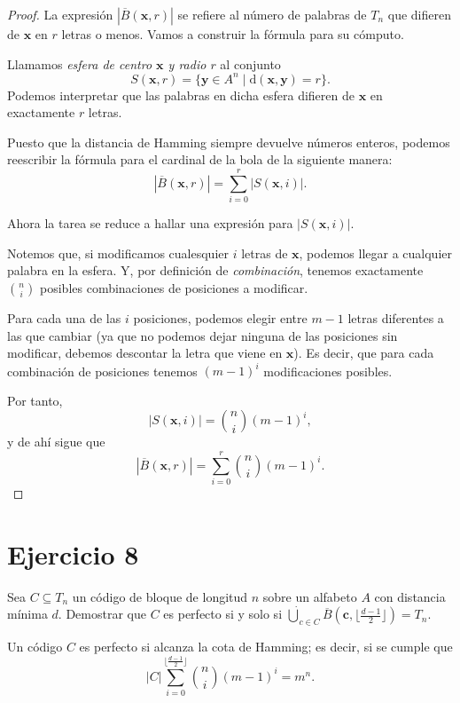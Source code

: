 \begin{proof}
	La expresión $|\overline{B}(\textbf{x}, r)|$ se refiere al número de palabras de $T_n$ que difieren de $\textbf{x}$ en $r$ letras o menos. Vamos a construir la fórmula para su cómputo.
	
	Llamamos \textit{esfera de centro $\textbf{x}$ y radio $r$} al conjunto
	\[S(\textbf{x}, r) = \{\textbf{y}\in A^n\mid\mathrm{d}(\textbf{x},\textbf{y}) = r\}.\]
	Podemos interpretar que las palabras en dicha esfera difieren de $\textbf{x}$ en exactamente $r$ letras.
	
	Puesto que la distancia de Hamming siempre devuelve números enteros, podemos reescribir la fórmula para el cardinal de la bola de la siguiente manera:
	\[|\overline{B}(\textbf{x}, r)| = \sum_{i=0}^r|S(\textbf{x}, i)|.\]
	
	Ahora la tarea se reduce a hallar una expresión para $|S(\textbf{x}, i)|$.
	
	Notemos que, si modificamos cualesquier $i$ letras de $\textbf{x}$, podemos llegar a cualquier palabra en la esfera. Y, por definición de \textit{combinación}, tenemos exactamente $\binom{n}{i}$ posibles combinaciones de posiciones a modificar.
	
	Para cada una de las $i$ posiciones, podemos elegir entre $m-1$ letras diferentes a las que cambiar (ya que no podemos dejar ninguna de las posiciones sin modificar, debemos descontar la letra que viene en $\textbf{x}$). Es decir, que para cada combinación de posiciones tenemos $(m-1)^i$ modificaciones posibles.
	
	Por tanto,
	\[|S(\textbf{x}, i)| = \binom{n}{i}(m-1)^i,\]
	y de ahí sigue que
	\[|\overline{B}(\textbf{x}, r)| = \sum_{i=0}^r\binom{n}{i}(m-1)^i.\]
\end{proof}

\section{Ejercicio 8}

\begin{formulationBox}
	Sea $C\subseteq T_n$ un código de bloque de longitud $n$ sobre un alfabeto $A$ con distancia mínima $d$. Demostrar que $C$ es perfecto si y solo si $\dot{\bigcup}_{c\in C}\overline{B}(\textbf{c}, \lfloor\frac{d-1}{2}\rfloor) = T_n$.
\end{formulationBox}

Un código $C$ es perfecto si alcanza la cota de Hamming; es decir, si se cumple que
\[|C|\sum_{i=0}^{\lfloor\frac{d-1}{2}\rfloor} \binom{n}{i} (m-1)^i = m^n.\]

